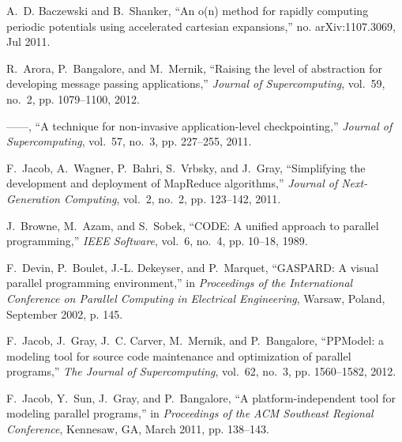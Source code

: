 \documentclass[draftclsnofoot]{elsarticle}
\begin{document}
\begin{thebibliography}{10}
A.~D. Baczewski and B.~Shanker, ``An o(n) method for rapidly computing periodic
  potentials using accelerated cartesian expansions,'' no. arXiv:1107.3069, Jul
  2011.

R.~Arora, P.~Bangalore, and M.~Mernik, ``Raising the level of abstraction for
  developing message passing applications,'' \emph{Journal of Supercomputing},
  vol.~59, no.~2, pp. 1079--1100, 2012.

------, ``A technique for non-invasive application-level checkpointing,''
  \emph{Journal of Supercomputing}, vol.~57, no.~3, pp. 227--255, 2011.

F.~Jacob, A.~Wagner, P.~Bahri, S.~Vrbsky, and J.~Gray, ``Simplifying the
  development and deployment of {M}ap{R}educe algorithms,'' \emph{Journal of
  Next-Generation Computing}, vol.~2, no.~2, pp. 123--142, 2011.

J.~Browne, M.~Azam, and S.~Sobek, ``{CODE}: {A} unified approach to parallel
  programming,'' \emph{IEEE Software}, vol.~6, no.~4, pp. 10--18, 1989.

F.~Devin, P.~Boulet, J.-L. Dekeyser, and P.~Marquet, ``{GASPARD}: {A} visual
  parallel programming environment,'' in \emph{Proceedings of the International
  Conference on Parallel Computing in Electrical Engineering}, Warsaw, Poland,
  September 2002, p. 145.

F.~Jacob, J.~Gray, J.~C. Carver, M.~Mernik, and P.~Bangalore, ``{PPModel}: a
  modeling tool for source code maintenance and optimization of parallel
  programs,'' \emph{The Journal of Supercomputing}, vol.~62, no.~3, pp.
  1560--1582, 2012.

F.~Jacob, Y.~Sun, J.~Gray, and P.~Bangalore, ``A platform-independent tool for
  modeling parallel programs,'' in \emph{Proceedings of the ACM Southeast
  Regional Conference}, Kennesaw, GA, March 2011, pp. 138--143.

\end{thebibliography}
%
%






\end{document}

